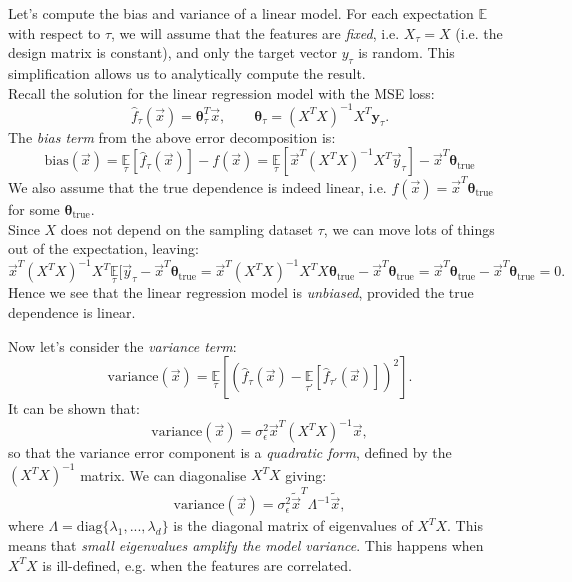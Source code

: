 \begin{frameex}
Let's compute the bias and variance of a linear model. For each expectation $\mathbb{E}$ with respect to $\tau$, we will assume that the features are \textit{fixed}, i.e. $X_{\tau} = X$ (i.e. the design matrix is constant), and only the target vector $y_{\tau}$ is random. This simplification allows us to analytically compute the result.\\

Recall the solution for the linear regression model with the MSE loss:
\begin{equation*}
\hat{f}_{\tau}(\vec{x}) = \pmb{\theta}_{\tau}^T\vec{x}, \qquad \pmb{\theta}_{\tau} = (X^TX)^{-1} X^T \pmb{y}_{\tau}.
\end{equation*}
The \textit{bias term} from the above error decomposition is:
\begin{equation*}
\textrm{bias}(\vec{x}) = \underset{\tau}{\mathbb{E}}[\hat{f}_{\tau}(\vec{x})] - f(\vec{x}) = \underset{\tau}{\mathbb{E}}\left[ \vec{x}^T (X^TX)^{-1}X^T \vec{y}_{\tau} \right] - \vec{x}^T \pmb{\theta}_{\text{true}}
\end{equation*}
We also assume that the true dependence is indeed linear, i.e. $f(\vec{x}) = \vec{x}^T \pmb{\theta}_{\text{true}}$ for some $\pmb{\theta}_{\text{true}}$.\\

Since $X$ does not depend on the sampling dataset $\tau$, we can move lots of things out of the expectation, leaving:
\begin{equation*}
\vec{x}^T (X^TX)^{-1}X^T \underset{\tau}{\mathbb{E}}[\vec{y}_{\tau} - \vec{x}^T \pmb{\theta}_{\text{true}} = \vec{x}^T (X^TX)^{-1} X^TX \pmb{\theta}_{\text{true}} - \vec{x}^T \pmb{\theta}_{\text{true}} = \vec{x}^T \pmb{\theta}_{\text{true}} - \vec{x}^T \pmb{\theta}_{\text{true}} = 0.
\end{equation*}
Hence we see that the linear regression model is \textit{unbiased}, provided the true dependence is linear.


\newpage
Now let's consider the \textit{variance term}:
\begin{equation*}
\textrm{variance}(\vec{x}) = \underset{\tau}{\mathbb{E}} \left[ \left(\hat{f}_{\tau}(\vec{x}) - \underset{\tau'}{\mathbb{E}}[\hat{f}_{\tau'}(\vec{x})]\right)^2 \right].
\end{equation*}
It can be shown that:
\begin{equation*}
\textrm{variance}(\vec{x}) = \sigma_{\epsilon}^2 \vec{x}^T (X^TX)^{-1} \vec{x},
\end{equation*}
so that the variance error component is a \textit{quadratic form}, defined by the $(X^TX)^{-1}$ matrix. We can diagonalise $X^TX$ giving:
\begin{equation*}
\textrm{variance}(\vec{x}) = \sigma_{\epsilon}^2 \tilde{\vec{x}}^T \Lambda^{-1} \tilde{\vec{x}},
\end{equation*}
where $\Lambda = \textrm{diag}\{\lambda_1,...,\lambda_d\}$ is the diagonal matrix of eigenvalues of $X^TX$. This means that \textit{small eigenvalues amplify the model variance}. This happens when $X^TX$ is ill-defined, e.g. when the features are correlated.


\end{frameex}

